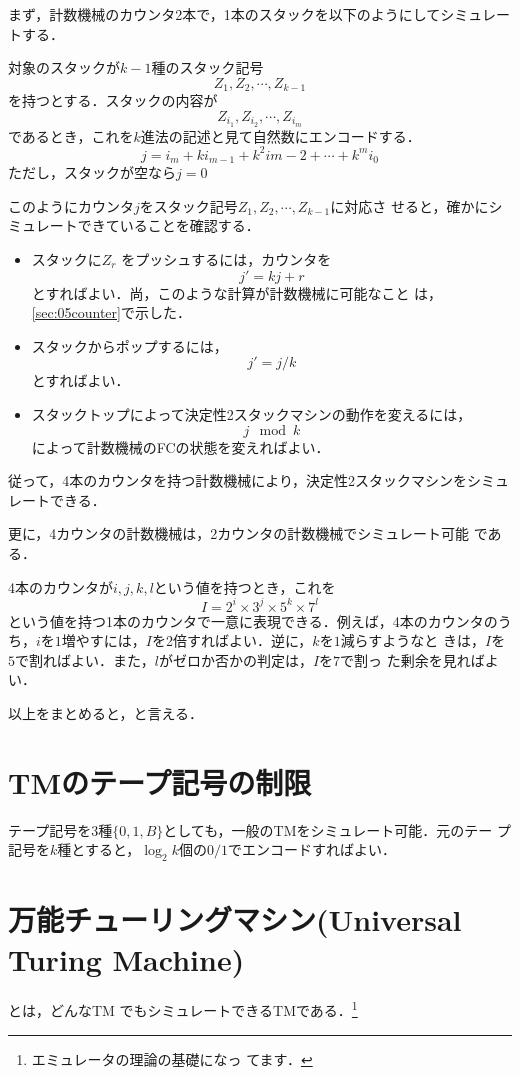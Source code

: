 まず，計数機械のカウンタ2本で，1本のスタックを以下のようにしてシミュレー
トする．

対象のスタックが$k-1$種のスタック記号
\[
 Z_1, Z_2, \cdots , Z_{k-1}
\]
を持つとする．スタックの内容が
\[
 Z_{i_1}, Z_{i_2}, \cdots, Z_{i_m}
\]
であるとき，これを$k$進法の記述と見て自然数にエンコードする．
\[
 j = i_m + k i_{m-1} + k^2 i{m-2} + \cdots + k^m i_0
\]
ただし，スタックが空なら$j=0$

このようにカウンタ$j$をスタック記号$Z_1, Z_2, \cdots , Z_{k-1}$に対応さ
せると，確かにシミュレートできていることを確認する．

\begin{itemize}
 \item スタックに$Z_r$ をプッシュするには，カウンタを
       \[
        j' = k j + r
       \]
       とすればよい．尚，このような計算が計数機械に可能なこと
       は，\ref{sec:05counter}で示した．
 \item スタックからポップするには，
       \[
        j' = j / k
       \]
       とすればよい．
 \item スタックトップによって決定性2スタックマシンの動作を変えるには，
       \[
        j \mod k
       \]
       によって計数機械のFCの状態を変えればよい．
\end{itemize}

従って，4本のカウンタを持つ計数機械により，決定性2スタックマシンをシミュ
レートできる．

更に，4カウンタの計数機械は，2カウンタの計数機械でシミュレート可能
である．

4本のカウンタが$i, j, k, l$という値を持つとき，これを
\[
 I = 2^i \times 3^j \times 5^k \times 7^l
\]
という値を持つ1本のカウンタで一意に表現できる．例えば，4本のカウンタのう
ち，$i$を$1$増やすには，$I$を2倍すればよい．逆に，$k$を$1$減らすようなと
きは，$I$を$5$で割ればよい．また，$l$がゼロか否かの判定は，$I$を$7$で割っ
た剰余を見ればよい．

以上をまとめると，と言える．

\section{TMのテープ記号の制限}
テープ記号を3種$\{0,1,B\}$としても，一般のTMをシミュレート可能．元のテー
プ記号を$k$種とすると，$\log_2 k$個の$0/1$でエンコードすればよい．


\section{万能チューリングマシン(Universal Turing Machine)}
とは，どんなTM
でもシミュレートできるTMである．\footnote{エミュレータの理論の基礎になっ
てます．}

